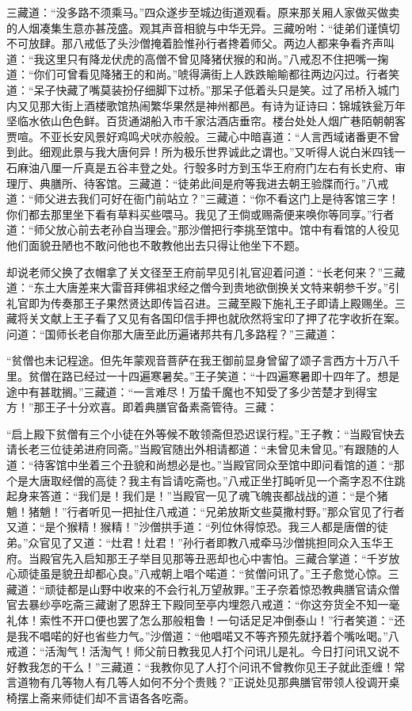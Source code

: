 \documentclass[12pt,UTF8]{ctexbook}
\begin{document}
{	三藏道：“没多路不须乘马。”四众遂步至城边街道观看。原来那关厢人家做买做卖的人烟凑集生意亦甚茂盛。观其声音相貌与中华无异。三藏吩咐：“徒弟们谨慎切不可放肆。那八戒低了头沙僧掩着脸惟孙行者搀着师父。两边人都来争看齐声叫道：“我这里只有降龙伏虎的高僧不曾见降猪伏猴的和尚。”八戒忍不住把嘴一掬道：“你们可曾看见降猪王的和尚。”唬得满街上人跌跌睮睮都往两边闪过。行者笑道：“呆子快藏了嘴莫装扮仔细脚下过桥。”那呆子低着头只是笑。过了吊桥入城门内又见那大街上酒楼歌馆热闹繁华果然是神州都邑。有诗为证诗曰：锦城铁瓮万年坚临水依山色色鲜。百货通湖船入市千家沽酒店垂帘。楼台处处人烟广巷陌朝朝客贾喧。不亚长安风景好鸡鸣犬吠亦般般。三藏心中暗喜道：“人言西域诸番更不曾到此。细观此景与我大唐何异！所为极乐世界诚此之谓也。”又听得人说白米四钱一石麻油八厘一斤真是五谷丰登之处。行彀多时方到玉华王府府门左右有长史府、审理厅、典膳所、待客馆。三藏道：“徒弟此间是府等我进去朝王验牒而行。”八戒道：“师父进去我们可好在衙门前站立？”三藏道：“你不看这门上是待客馆三字！你们都去那里坐下看有草料买些喂马。我见了王倘或赐斋便来唤你等同享。”行者道：“师父放心前去老孙自当理会。”那沙僧把行李挑至馆中。馆中有看馆的人役见他们面貌丑陋也不敢问他也不敢教他出去只得让他坐下不题。
	
	却说老师父换了衣帽拿了关文径至王府前早见引礼官迎着问道：“长老何来？”三藏道：“东土大唐差来大雷音拜佛祖求经之僧今到贵地欲倒换关文特来朝参千岁。”引礼官即为传奏那王子果然贤达即传旨召进。三藏至殿下施礼王子即请上殿赐坐。三藏将关文献上王子看了又见有各国印信手押也就欣然将宝印了押了花字收折在案。问道：“国师长老自你那大唐至此历遍诸邦共有几多路程？”三藏道：
	
	“贫僧也未记程途。但先年蒙观音菩萨在我王御前显身曾留了颂子言西方十万八千里。贫僧在路已经过一十四遍寒暑矣。”王子笑道：“十四遍寒暑即十四年了。想是途中有甚耽搁。”三藏道：“一言难尽！万蛰千魔也不知受了多少苦楚才到得宝方！”那王子十分欢喜。即着典膳官备素斋管待。三藏：
	
	“启上殿下贫僧有三个小徒在外等候不敢领斋但恐迟误行程。”王子教：“当殿官快去请长老三位徒弟进府同斋。”当殿官随出外相请都道：“未曾见未曾见。”有跟随的人道：“待客馆中坐着三个丑貌和尚想必是也。”当殿官同众至馆中即问看馆的道：“那个是大唐取经僧的高徒？我主有旨请吃斋也。”八戒正坐打盹听见一个斋字忍不住跳起身来答道：“我们是！我们是！”当殿官一见了魂飞魄丧都战战的道：“是个猪魈！猪魈！”行者听见一把扯住八戒道：“兄弟放斯文些莫撒村野。”那众官见了行者又道：“是个猴精！猴精！”沙僧拱手道：“列位休得惊恐。我三人都是唐僧的徒弟。”众官见了又道：“灶君！灶君！”孙行者即教八戒牵马沙僧挑担同众入玉华王府。当殿官先入启知那王子举目见那等丑恶却也心中害怕。三藏合掌道：“千岁放心顽徒虽是貌丑却都心良。”八戒朝上唱个喏道：“贫僧问讯了。”王子愈觉心惊。三藏道：“顽徒都是山野中收来的不会行礼万望赦罪。”王子奈着惊恐教典膳官请众僧官去暴纱亭吃斋三藏谢了恩辞王下殿同至亭内埋怨八戒道：“你这夯货全不知一毫礼体！索性不开口便也罢了怎么那般粗鲁！一句话足足冲倒泰山！”行者笑道：“还是我不唱喏的好也省些力气。”沙僧道：“他唱喏又不等齐预先就抒着个嘴吆喝。”八戒道：“活淘气！活淘气！师父前日教我见人打个问讯儿是礼。今日打问讯又说不好教我怎的干么！”三藏道：“我教你见了人打个问讯不曾教你见王子就此歪缠！常言道物有几等物人有几等人如何不分个贵贱？”正说处见那典膳官带领人役调开桌椅摆上斋来师徒们却不言语各各吃斋。
	
}
\end{document}
